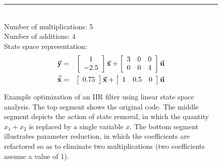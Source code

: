 \begin{figure*}[t]
\begin{singlespace}
{\begin{minipage}{3.5in}
\begin{eqnarray*}
\end{eqnarray*}
\vspace{15pt} ~ \\
\hrule
\vspace{24pt} ~ \\
Number of multiplications: 5 \\
Number of additions: 4 \\
State space representation:
\begin{eqnarray*}
\small
\vec{\mathbf{y}} & = & \left [ \begin{array} {cc} 1 \\ -2.5
\end{array} \right ] \vec{\mathbf{x}} + \left [ \begin{array} {ccc} 3 & 0 & 0 \\ 0 & 0 & 4 \end{array} \right
 ] \vec{\mathbf{u}} \\
\vec{\dot{\mathbf{x}}} & = & \left [ \begin{array} {cc} 0.75
\end{array} \right ] \vec{\mathbf{x}} + \left [ \begin{array} {ccc} 1 & 0.5 & 0 \end{array} \right ] \vec{\mathbf{u}}
\end{eqnarray*}
\end{minipage}}
\end{singlespace}
\begin{center}
\vspace{-24pt}

\caption{Example optimization of an IIR filter using linear state
space analysis.  The top segment shows the original code.  The middle
segment depicts the action of state removal, in which the quantity
$x_1 + x_2$ is replaced by a single variable $x$.  The bottom segment
illustrates parameter reduction, in which the coefficients are
refactored so as to eliminate two multiplications (two coefficients
assume a value of 1).\protect\label{fig:opt-seq}}
\end{center}
\vspace{-12pt}
\end{figure*}
